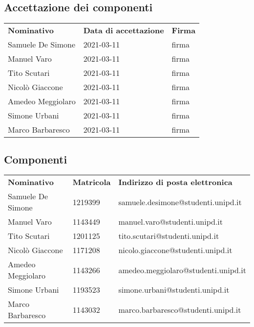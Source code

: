     \subsection{Accettazione dei componenti}
        \begin{center}
            \begin{table}[h!]
                \centering
                \renewcommand{\arraystretch}{1.8}
                \begin{tabular}{p{150px} p{110px} p{110px}}
                    \rowcolor{logo!70} \textbf{Nominativo} & \textbf{Data di accettazione} & \textbf{Firma}\\
                    Samuele De Simone & 2021-03-11 & firma \\
                    Manuel Varo & 2021-03-11 & firma \\
                    Tito Scutari & 2021-03-11 & firma \\
                    Nicolò Giaccone & 2021-03-11 & firma \\
                    Amedeo Meggiolaro & 2021-03-11 & firma \\
                    Simone Urbani & 2021-03-11 & firma \\
                    Marco Barbaresco & 2021-03-11 & firma \\
                \end{tabular}
            \end{table}
        \end{center}
    \subsection{Componenti}
        \begin{center}
            \begin{table}[h!]
                \centering
                \renewcommand{\arraystretch}{1.8}
                \begin{tabular}{p{150px} p{50px} p{170px}}
                    \rowcolor{logo!70} \textbf{Nominativo} & \textbf{Matricola} & \textbf{Indirizzo di posta elettronica}\\
                    Samuele De Simone & 1219399 & samuele.desimone@studenti.unipd.it \\
                    Manuel Varo & 1143449 & manuel.varo@studenti.unipd.it \\
                    Tito Scutari & 1201125 & tito.scutari@studenti.unipd.it \\
                    Nicolò Giaccone & 1171208 & nicolo.giaccone@studenti.unipd.it \\
                    Amedeo Meggiolaro & 1143266 & amedeo.meggiolaro@studenti.unipd.it \\
                    Simone Urbani & 1193523 & simone.urbani@studenti.unipd.it \\
                    Marco Barbaresco & 1143032 & marco.barbaresco@studenti.unipd.it \\
                \end{tabular}
            \end{table}
        \end{center}
